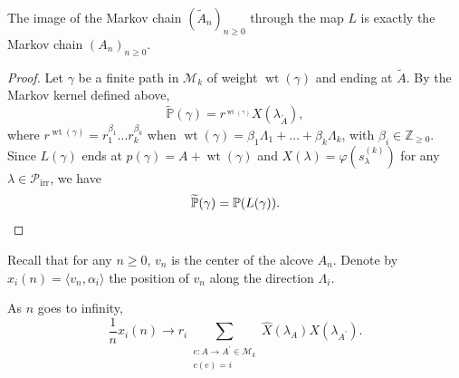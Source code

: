 \documentclass[ALCO,ThmDefs,Unicode,epreuves]{cedram}
\DeclareMathOperator{\irr}{irr}
\DeclareMathOperator{\wt}{wt}
\begin{document}
\begin{lemma}
The image of the Markov chain $(\tilde{A}_{n})_{n\geq0}$ through the map $L$
is exactly the Markov chain $(A_{n})_{n\geq0}$.
\end{lemma}

\begin{proof}
Let $\gamma$ be a finite path in $\mathcal{M}_{k}$ of weight $\wt %
(\gamma)$ and ending at $\tilde{A}$. By the Markov kernel defined above,
\[
\widetilde{\mathbb{P}}(\gamma)=r^{_{\wt (\gamma)}}X(\lambda_{\tilde{A}%
}),
\]
where $r^{\wt (\gamma)}=r_{1}^{\beta_{1}}\dots r_{k}^{\beta_{k}}$ when
$\wt (\gamma)=\beta_{1}\Lambda_{1}+\dots+\beta_{k}\Lambda_{k}$, with
$\beta_{i}\in\mathbb{Z}_{\geq0}$. Since $L(\gamma)$ ends at $p(\gamma
)=A+\wt (\gamma)$ and $X(\lambda)=\varphi(s_{\lambda}^{(k)})$ for any
$\lambda\in\mathcal{P}_{\irr }$, we have
\[
\widetilde{\mathbb{P}}(\gamma)=\mathbb{P}(L(\gamma)).\qedhere
\]
\end{proof}


Recall that for any $n\geq0$, $v_{n}$ is the center of the alcove $A_{n}$.
Denote by $x_{i}(n)=\langle v_{n},\alpha_{i}\rangle$ the position of $v_{n}$
along the direction $\Lambda_{i}$.

\begin{lemma}
As $n$ goes to infinity,
\[
\frac{1}{n}x_{i}(n)\longrightarrow r_{i}\sum_{\substack{e:A\rightarrow
A^{\prime}\in\mathcal{M}_{k}\\c(e)=i}}\widehat{X}(\lambda_{A})X(\lambda
_{A^{\prime}}).
\]

\end{lemma}
\end{document}
